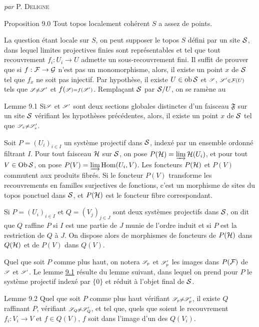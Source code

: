 \documentclass[10pt]{../fichiers-configuration-latex/smfart}
\begin{document}
\centerline{\textit{par} P. \textsc{Deligne}}

\medskip
\begin{enonce*}{Proposition 9.0}
Tout topos localement cohérent $S$ a assez de points.
\end{enonce*}

La question étant locale sur $S$, on peut supposer le topos $S$
défini par un site $\Ss$, dans lequel  limites projectives finies
sont représentables et tel que tout recouvrement $f_i : U_i \to U$
admette un sous-recouvrement fini. Il suffit de prouver que si $f :
\Ff \to \Gg$ n'est pas un monomorphisme, alors, il existe un point
$x$ de $\Ss$ tel que $f_x$ ne soit pas injectif. Par hypothèse, il
existe $U \in \ob \Ss$ et $\ss$, $\ss'\in \Ff(U)$ tels que $\ss \neq
\ss'$ et $f(\ss) = f(\ss')$. Remplaçant $\Ss$ par $\Ss/U$, on se
ramène au

\begin{enonce*}{Lemme 9.1}
Si\pageoriginale $\ss$ et $\ss'$ sont deux sections globales distinctes d'un faisceau
$\mathfrak{F}$ sur un site $\Ss$ vérifiant les hypothèses précédentes,
alors, il existe un point $x$ de $\Ss$ tel que $\ss_x
\neq \ss'_x$.
\end{enonce*}

Soit $P = (U_i)_{i \in I}$ un système projectif dans $\Ss$, indexé par
un ensemble ordonné filtrant $I$. Pour tout faisceau $\Hh$ sur
$\Ss$, on pose $P(\Hh) = \varinjlim \Hh(U_i)$, et pour
tout $V \in \Ob \Ss$, on pose $P(V) = \varinjlim \Hom (U_i, V)$. Les
foncteurs $P(\Hh)$ et $P(V)$ commutent aux produits fibrés. Si
le foncteur $P(V)$ transforme les recouvrements en familles
surjectives de fonctions, c'est un morphisme de sites du topos
ponctuel dans $\Ss$, et $P(\Hh)$ est le foncteur fibre
correspondant.

Si $P = (U_i)_{i \in I}$ et $Q = (V_j)_{j \in J}$ sont deux systèmes
projectifs dans $\Ss$, on dit que $Q$ raffine $P$ si $I$ est une partie
de $J$ munie de l'ordre induit et si $P$ est la restriction de $Q$ à
$J$. On dispose alors de morphismes de foncteurs de $P(\Hh)$
dans $Q(\Hh)$ et de $P(V)$ dans $Q(V)$.

Quel que soit $P$ comme plus haut, on notera $\ss_p$ et
$\ss'_p$ les images dans $P(\Ff)$ de $\ss$ et $\ss'$. Le lemme \hyperref[VI.lem9.1]{9.1} résulte du
lemme suivant, dans lequel on prend pour $P$ le système projectif
indexé par $\{0\}$ et réduit à l'objet final de $\Ss$.

\begin{enonce*}{Lemme 9.2}
Quel que soit $P$ comme plus haut vérifiant $\ss_p \neq \ss'_p$, il
existe $Q$ raffinant $P$, vérifiant $\ss_Q \neq \ss'_Q$, et tel que,
quels que soient le recouvrement $f_i : V_i \to V$ et $f \in Q(V)$,
$f$ soit dans l'image d'un des $Q(V_i)$.
\end{enonce*}
\end{document}
